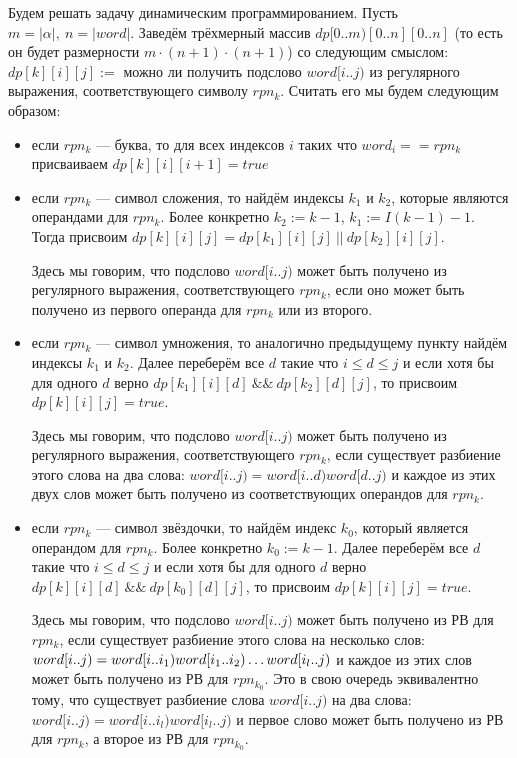 \documentclass{article}
\begin{document}
Будем решать задачу динамическим программированием. 
Пусть $m = |\alpha|,~n = |word|$. 
Заведём трёхмерный массив $dp[0..m)[0..n][0..n]$ (то есть он будет размерности $m \cdot (n + 1) \cdot (n + 1)$) со следующим смыслом: 
$dp[k][i][j] :=$ можно ли получить подслово $word[i..j)$ из регулярного выражения, соответствующего символу $rpn_k$.
Считать его мы будем следующим образом:
\begin{itemize}
\item если $rpn_k$ --- буква, то для всех индексов $i$ таких что $word_i == rpn_k$ присваиваем $dp[k][i][i + 1] = true$

\item если $rpn_k$ --- символ сложения, то найдём индексы $k_1$ и $k_2$, которые являются операндами для $rpn_k$. 
Более конкретно $k_2 := k - 1$, $k_1 := I(k - 1) - 1$. Тогда присвоим $dp[k][i][j] = dp[k_1][i][j]~||~dp[k_2][i][j]$. 

Здесь мы говорим, что подслово $word[i..j)$ может быть получено из регулярного выражения, соответствующего $rpn_k$, если оно может быть получено из первого операнда для $rpn_k$ или из второго.

\item если $rpn_k$ --- символ умножения, то аналогично предыдущему пункту найдём индексы $k_1$ и $k_2$. Далее переберём все $d$ такие что $i \leq d \leq j$ и если хотя бы для одного $d$ верно $dp[k_1][i][d]~\&\&~dp[k_2][d][j]$, то присвоим $dp[k][i][j] = true$. 

Здесь мы говорим, что подслово $word[i..j)$ может быть получено из регулярного выражения, соответствующего $rpn_k$, если существует разбиение этого слова на два слова: $word[i..j) = word[i..d)word[d..j)$ и каждое из этих двух слов может быть получено из соответствующих операндов для $rpn_k$.

\item если $rpn_k$ --- символ звёздочки, то найдём индекс $k_0$, который является операндом для $rpn_k$. 
Более конкретно $k_0 := k - 1$. Далее переберём все $d$ такие что $i \leq d \leq j$ и если хотя бы для одного $d$ верно $dp[k][i][d]~\&\&~dp[k_0][d][j]$, то присвоим $dp[k][i][j] = true$. 

Здесь мы говорим, что подслово $word[i..j)$ может быть получено из РВ для $rpn_k$, если существует разбиение этого слова на несколько слов: $word[i..j) =\\ word[i..i_1)word[i_1..i_2) \dots word[i_l..j)$ и каждое из этих слов может быть получено из РВ для $rpn_{k_0}$. Это в свою очередь эквивалентно тому, что существует разбиение слова $word[i..j)$ на два слова: $word[i..j) = word[i..i_l)word[i_l..j)$ и первое слово может быть получено из РВ для $rpn_k$, а второе из РВ для $rpn_{k_0}$. 
\end{itemize}
\end{document}
